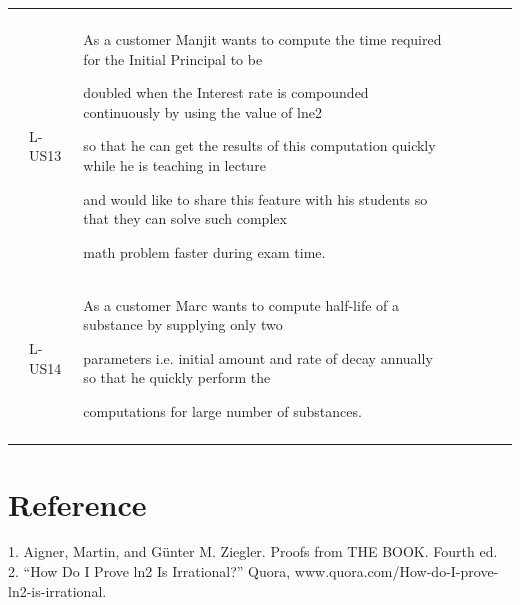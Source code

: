 \documentclass[12pt]{article}
\begin{document}
{\begin{longtable}{p{0.56in}p{0.65in}p{1.19in}p{0.53in}p{0.46in}p{0.64in}p{0.99in}}
\multicolumn{1}{|p{0.53in}}{} & 
\multicolumn{1}{|p{0.46in}}{} & 
\multicolumn{1}{|p{0.64in}}{} & 
\multicolumn{1}{|p{0.99in}|}{} \\
\hhline{-------}
\multicolumn{1}{|p{0.56in}}{Local} & 
\multicolumn{1}{|p{0.65in}}{L-US13} & 
\multicolumn{1}{|p{1.19in}}{As a customer Manjit wants to compute the time required for the Initial Principal to be \par doubled when the Interest rate is compounded continuously by using the value of lne2 \par so that he can get the results of this computation quickly while he is teaching in lecture \par and would like to share this feature with his students so that they can solve such complex \par math problem faster during exam time.} & 
\multicolumn{1}{|p{0.53in}}{} & 
\multicolumn{1}{|p{0.46in}}{} & 
\multicolumn{1}{|p{0.64in}}{} & 
\multicolumn{1}{|p{0.99in}|}{} \\
\hhline{-------}
\multicolumn{1}{|p{0.56in}}{Local} & 
\multicolumn{1}{|p{0.65in}}{L-US14} & 
\multicolumn{1}{|p{1.19in}}{As a customer Marc wants to compute half-life of a substance by supplying only two \par parameters i.e. initial amount and rate of decay annually so that he quickly perform the \par computations for large number of substances.} & 
\multicolumn{1}{|p{0.53in}}{} & 
\multicolumn{1}{|p{0.46in}}{} & 
\multicolumn{1}{|p{0.64in}}{} & 
\multicolumn{1}{|p{0.99in}|}{} \\
\hhline{-------}

\end{longtable}}
\section{Reference}
1. Aigner, Martin, and Günter M. Ziegler. Proofs from THE BOOK. Fourth ed.\\
2. “How Do I Prove ln2 Is Irrational?” Quora, www.quora.com/How-do-I-prove-ln2-is-irrational.
\end{document}
